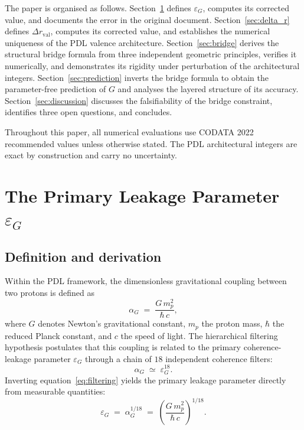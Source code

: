 \documentclass[11pt,a4paper]{article}
\begin{document}
The paper is organised as follows. Section~\ref{sec:eps_G} defines $\varepsilon_G$, computes its corrected value, and documents the error in the original document. Section~\ref{sec:delta_r} defines $\Delta r_{\mathrm{val}}$, computes its corrected value, and establishes the numerical uniqueness of the PDL valence architecture. Section~\ref{sec:bridge} derives the structural bridge formula from three independent geometric principles, verifies it numerically, and demonstrates its rigidity under perturbation of the architectural integers. Section~\ref{sec:prediction} inverts the bridge formula to obtain the parameter-free prediction of $G$ and analyses the layered structure of its accuracy. Section~\ref{sec:discussion} discusses the falsifiability of the bridge constraint, identifies three open questions, and concludes.

Throughout this paper, all numerical evaluations use CODATA 2022 recommended values \cite{CODATA_2022} unless otherwise stated. The PDL architectural integers are exact by construction and carry no uncertainty.


\section{The Primary Leakage Parameter \texorpdfstring{$\varepsilon_G$}{epsilon\_G}}
\label{sec:eps_G}

\subsection{Definition and derivation}

Within the PDL framework, the dimensionless gravitational coupling between two protons is defined as
\begin{equation}
    \alpha_G \;=\; \frac{G\,m_p^2}{\hbar\,c},
    \label{eq:alpha_G}
\end{equation}
where $G$ denotes Newton's gravitational constant, $m_p$ the proton mass, $\hbar$ the reduced Planck constant, and $c$ the speed of light. The hierarchical filtering hypothesis \cite{Exponent_18_PDL_2026} postulates that this coupling is related to the primary coherence-leakage parameter $\varepsilon_G$ through a chain of $18$ independent coherence filters:
\begin{equation}
    \alpha_G \;\simeq\; \varepsilon_G^{18}.
    \label{eq:filtering}
\end{equation}
Inverting equation~\eqref{eq:filtering} yields the primary leakage parameter directly from measurable quantities:
\begin{equation}
    \varepsilon_G 
    \;=\; \alpha_G^{1/18} 
    \;=\; \left(\frac{G\,m_p^2}{\hbar\,c}\right)^{1/18}.
    \label{eq:eps_G}
\end{equation}
\end{document}
